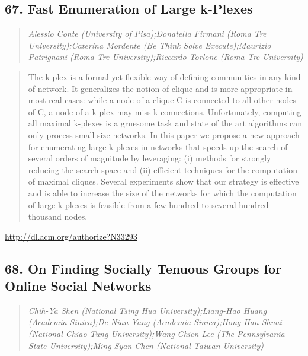 \documentclass{article}
\begin{document}
\subsection{67. Fast Enumeration of Large k-Plexes}

\begin{quote}
\footnotesize{\textit{Alessio Conte (University of Pisa);Donatella Firmani (Roma Tre University);Caterina Mordente (Be Think Solve Execute);Maurizio Patrignani (Roma Tre University);Riccardo Torlone (Roma Tre University)}}

\end{quote}

\begin{quote}
The k-plex is a formal yet flexible way of defining communities in any kind of network. It generalizes the notion of clique and is more appropriate in most real cases: while a node of a clique C is connected to all other nodes of C, a node of a k-plex may miss k connections. Unfortunately, computing all maximal k-plexes is a gruesome task and state of the art algorithms can only process small-size networks. In this paper we propose a new approach for enumerating large k-plexes in networks that speeds up the search of several orders of magnitude by leveraging: (i) methods for strongly reducing the search space and (ii) efficient techniques for the computation of maximal cliques. Several experiments show that our strategy is effective and is able to increase the size of the networks for which the computation of large k-plexes is feasible from a few hundred to several hundred thousand nodes.
\end{quote}

\href{http://dl.acm.org/authorize?N33293}{http://dl.acm.org/authorize?N33293}

\subsection{68. On Finding Socially Tenuous Groups for Online Social Networks}

\begin{quote}
\footnotesize{\textit{Chih-Ya Shen (National Tsing Hua University);Liang-Hao Huang (Academia Sinica);De-Nian Yang (Academia Sinica);Hong-Han Shuai (National Chiao Tung University);Wang-Chien Lee (The Pennsylvania State University);Ming-Syan Chen (National Taiwan University)}}

\end{quote}
\end{document}
